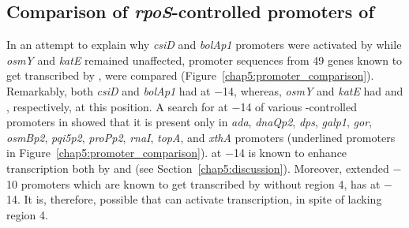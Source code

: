 \subsection{Comparison of \emph{rpoS}-controlled promoters of
}

In an attempt to explain why \emph{csiD} and \emph{bolAp1}
promoters were activated by \lzsig{} while \emph{osmY} and
\emph{katE} remained unaffected, promoter sequences from 49
 genes known to get transcribed by \sigs{}, were compared
(Figure~\ref{chap5:promoter_comparison}). Remarkably, both
\emph{csiD} and \emph{bolAp1} had  at $-$14, whereas,
\emph{osmY} and \emph{katE} had  and , respectively,
at this position. A search for  at $-$14 of various
\sigs{}-controlled promoters in  showed that it is
present only in \emph{ada}, \emph{dnaQp2}, \emph{dps},
\emph{galp1}, \emph{gor}, \emph{osmBp2}, \emph{pqi5p2},
\emph{proPp2}, \emph{rnaI}, \emph{topA}, and \emph{xthA} promoters
(underlined promoters in Figure~\ref{chap5:promoter_comparison}).
 at $-$14 is known to enhance transcription both by \siga{}
and \sigs{} (see Section~\ref{chap5:discussion}). Moreover,
extended $-$10 promoters which are known to get transcribed by
 \siga{} without region 4, has  at $-$14. It is,
therefore, possible that \lzsig{} can activate transcription, in
spite of lacking region 4.

